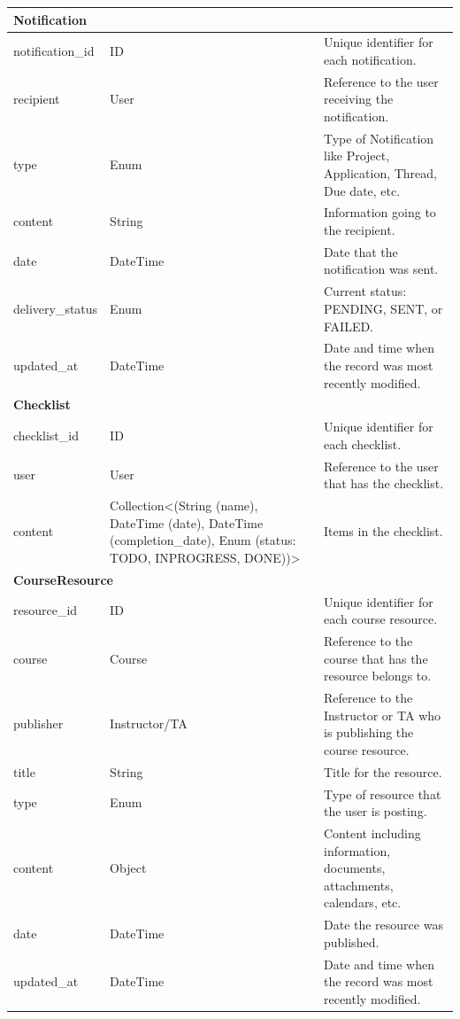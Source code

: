 \documentclass[12pt]{article}
\newcounter{tin}
\begin{document}
\begin{longtable}{|
      p{}|
      p{}|
      p{}|
  }
      \multicolumn{3}{|l|}{\textbf{Notification}}\\ \hline
      notification\_id & ID & Unique identifier for each notification. \\ \hline
      recipient & User & Reference to the user receiving the notification. \\ \hline
      type & Enum & Type of Notification like Project, Application, Thread, Due date, etc. \\ \hline
      content & String & Information going to the recipient. \\ \hline
      date & DateTime & Date that the notification was sent. \\ \hline
      delivery\_status & Enum & Current status: PENDING, SENT, or FAILED. \\ \hline
      updated\_at & DateTime & Date and time when the record was most recently modified. \\ \hline

      \multicolumn{3}{|l|}{\textbf{Checklist}}\\ \hline
      checklist\_id & ID & Unique identifier for each checklist. \\ \hline
      user & User & Reference to the user that has the checklist. \\ \hline
      content & Collection\textless (String (name), DateTime (date), DateTime (completion\_date), Enum (status: TODO, INPROGRESS, DONE))\textgreater & Items in the checklist. \\ \hline

      \multicolumn{3}{|l|}{\textbf{CourseResource}}\\ \hline
      resource\_id & ID & Unique identifier for each course resource. \\ \hline
      course & Course & Reference to the course that has the resource belongs to. \\ \hline
      publisher & Instructor/TA & Reference to the Instructor or TA who is publishing the course resource. \\ \hline
      title & String & Title for the resource. \\ \hline
      type & Enum & Type of resource that the user is posting. \\ \hline
      content & Object & Content including information, documents, attachments, calendars, etc. \\ \hline
      date & DateTime & Date the resource was published. \\ \hline
      updated\_at & DateTime & Date and time when the record was most recently modified. \\ \hline


\end{longtable}
\end{document}
